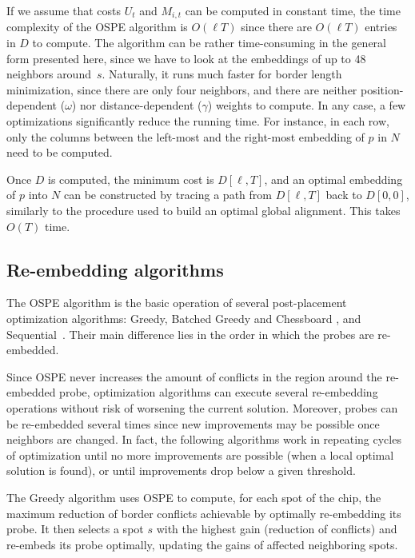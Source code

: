 \documentclass{w-edbk}
\begin{document}
If we assume that costs $U_t$ and $M_{i,t}$ can be computed in
constant time, the time complexity of the OSPE algorithm is $O(\ell
T)$ since there are $O(\ell T)$ entries in $D$ to compute. The algorithm can
be rather time-consuming in the general form presented here, since we
have to look at the embeddings of up to 48 neighbors around~$s$.
Naturally, it runs much faster for border length minimization, since
there are only four neighbors, and there are neither
position-dependent ($\omega$) nor distance-dependent ($\gamma$)
weights to compute. In any case, a few optimizations significantly
reduce the running time.  For instance, in each row, only the columns
between the left-most and the right-most embedding of $p$ in $N$ need
to be computed.

Once $D$ is computed, the minimum cost is $D[\ell,T]$, and an
optimal embedding of $p$ into $N$ can be constructed by tracing a path from
$D[\ell,T]$ back to $D[0,0]$, similarly to the procedure used to build an
optimal global alignment.  This takes $O(T)$ time.



\subsection{Re-embedding algorithms}

The OSPE algorithm is the basic operation of several post-placement
optimization algorithms: Greedy, Batched Greedy and Chessboard
\citep{Kahng2002}, and Sequential~\citep{Kahng2003a}. Their main difference
lies in the order in which the probes are re-embedded.

Since OSPE never increases the amount of conflicts in the region
around the re-embedded probe, optimization algorithms can execute
several re-embedding operations without risk of worsening the current
solution. Moreover, probes can be re-embedded several times since new
improvements may be possible once neighbors are changed.
In fact, the following
algorithms work in repeating cycles of optimization until no more
improvements are possible (when a local optimal solution is found), or
until improvements drop below a given threshold.
  
The Greedy algorithm uses OSPE to compute, for each spot of the chip,
the maximum reduction of border conflicts achievable by optimally
re-embedding its probe. It then selects a spot $s$ with the highest
gain (reduction of conflicts) and re-embeds its probe optimally,
updating the gains of affected neighboring spots.
\end{document}
